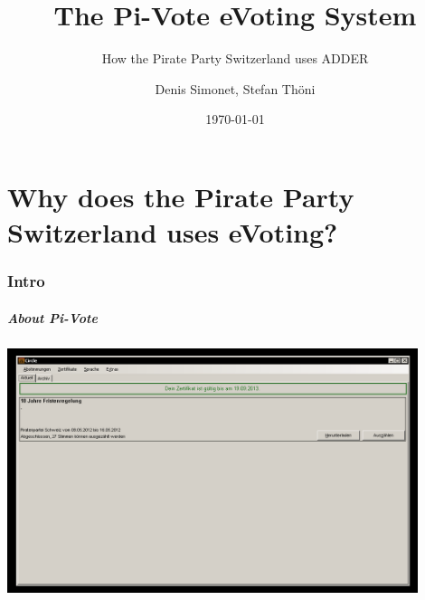 \documentclass[aspectratio=1610, compress, bigger]{beamer}
\title[Pi-Vote]{The Pi-Vote eVoting System}
\subtitle{How the Pirate Party Switzerland uses ADDER}
\author[D. Simonet, S. Thöni]{Denis Simonet, Stefan Thöni}
\date[\today]{\today}
\begin{document}

%

\frame[plain]{\maketitle}



\part[Part 1]{Why does the Pirate Party Switzerland uses eVoting?}

\frame[plain]{\partpage}

\section{Intro} 
\begin{frame}\frametitle{About Pi-Vote} 
\begin{center}
\includegraphics[width=12cm]{pivote.png}
\end{center}
\end{frame}
\end{document}
